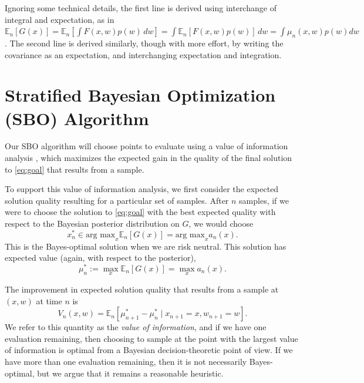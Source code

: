 \documentclass{article}
\newcommand{\w}{w}
\begin{document}
Ignoring some technical details, the first line is derived using interchange of integral and expectation, as in 
$\mathbb{E}_{n}\left[G(x) \right] 
= \mathbb{E}_{n}\left[\int F(x,\w) p(\w)\,d\w \right] 
= \int \mathbb{E}_{n}\left[F(x,\w) p(\w) \right] \,d\w
= \int\mu_{n}(x,w)p\left(w\right)d\w$.
The second line is derived similarly, though with more effort, by writing the covariance as an expectation, and interchanging expectation and integration.



\section{Stratified Bayesian Optimization (SBO) Algorithm}
\label{SBO}
Our SBO algorithm will choose points to evaluate using a value of information analysis \cite{Ho66}, which maximizes the expected gain in the quality of the final solution to \eqref{eq:goal} that results from a sample.

To support this value of information analysis, we first consider the expected solution quality resulting for a particular set of samples.
After $n$ samples, if we were to choose the solution to \eqref{eq:goal} with the best expected quality with respect to the Bayesian posterior distribution on $G$, we would choose
\begin{equation*}
x_{n}^{*} \in \mbox{arg max}_{x}\mathbb{E}_{n}\left[G(x)\right]=\mbox{arg max}_{x} a_n(x).
\end{equation*}
This is the Bayes-optimal solution when we are risk neutral.
This solution has expected value (again, with respect to the posterior),
\begin{equation*}
\mu_n^* := \max_{x}\mathbb{E}_{n}\left[G(x)\right]=\max_{x} a_n(x).
\end{equation*}

The improvement in expected solution quality that results from a sample at $(x,\w)$ at time $n$ is 
\begin{equation}
    V_n(x,\w) = \mathbb{E}_n\left[ \mu_{n+1}^* - \mu_n^* \mid x_{n+1}=x, \w_{n+1}=\w\right].
    \label{eq:VOI}
\end{equation}
We refer to this quantity as the {\it value of information}, and if we have one evaluation remaining, then choosing to sample at the point with the largest value of information is optimal from a Bayesian decision-theoretic point of view.
If we have more than one evaluation remaining, then it is not necessarily Bayes-optimal, but we argue that it remains a reasonable heuristic.
\end{document}
